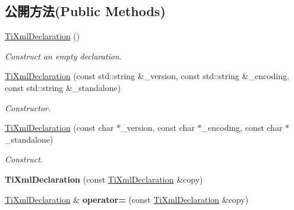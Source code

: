 \subsection*{公開方法(Public Methods)}
\begin{DoxyCompactItemize}
\item 
\hyperlink{class_ti_xml_declaration_aa0484d059bea0ea1acb47c9094382d79}{Ti\+Xml\+Declaration} ()\hypertarget{class_ti_xml_declaration_aa0484d059bea0ea1acb47c9094382d79}{}\label{class_ti_xml_declaration_aa0484d059bea0ea1acb47c9094382d79}

\begin{DoxyCompactList}\small\item\em Construct an empty declaration. \end{DoxyCompactList}\item 
\hyperlink{class_ti_xml_declaration_acd5556007c3c72209465081de39d9836}{Ti\+Xml\+Declaration} (const std\+::string \&\+\_\+version, const std\+::string \&\+\_\+encoding, const std\+::string \&\+\_\+standalone)\hypertarget{class_ti_xml_declaration_acd5556007c3c72209465081de39d9836}{}\label{class_ti_xml_declaration_acd5556007c3c72209465081de39d9836}

\begin{DoxyCompactList}\small\item\em Constructor. \end{DoxyCompactList}\item 
\hyperlink{class_ti_xml_declaration_a3b618d1c30c25e4b7a71f31a595ee298}{Ti\+Xml\+Declaration} (const char $\ast$\+\_\+version, const char $\ast$\+\_\+encoding, const char $\ast$\+\_\+standalone)\hypertarget{class_ti_xml_declaration_a3b618d1c30c25e4b7a71f31a595ee298}{}\label{class_ti_xml_declaration_a3b618d1c30c25e4b7a71f31a595ee298}

\begin{DoxyCompactList}\small\item\em Construct. \end{DoxyCompactList}\item 
{\bfseries Ti\+Xml\+Declaration} (const \hyperlink{class_ti_xml_declaration}{Ti\+Xml\+Declaration} \&copy)\hypertarget{class_ti_xml_declaration_a58ac9042c342f7845c8491da0bb091e8}{}\label{class_ti_xml_declaration_a58ac9042c342f7845c8491da0bb091e8}

\item 
\hyperlink{class_ti_xml_declaration}{Ti\+Xml\+Declaration} \& {\bfseries operator=} (const \hyperlink{class_ti_xml_declaration}{Ti\+Xml\+Declaration} \&copy)\hypertarget{class_ti_xml_declaration_a3bc617efe11014ff2b1a9c5727c37a9a}{}\label{class_ti_xml_declaration_a3bc617efe11014ff2b1a9c5727c37a9a}


\end{DoxyCompactItemize}
